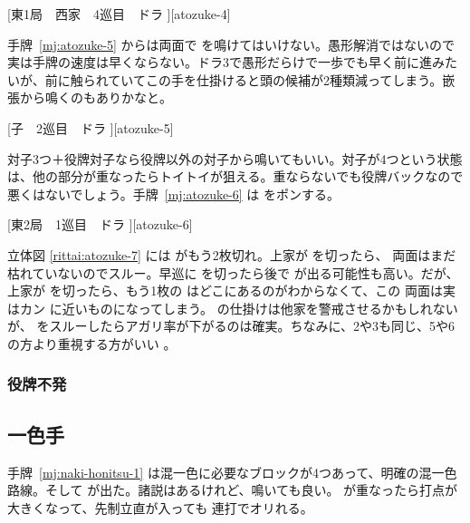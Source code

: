 \documentclass[../nankiru_main.tex]{subfiles}
\begin{document}
[東1局　西家　4巡目　ドラ ][atozuke-4]

手牌~\ref{mj:atozuke-5} からは両面で  を鳴けてはいけない。愚形解消ではないので実は手牌の速度は早くならない。ドラ3で愚形だらけで一歩でも早く前に進みたいが、前に触られていてこの手を仕掛けると頭の候補が2種類減ってしまう。嵌張から鳴くのもありかなと\citep[][pp.~116--117]{fkt}。

[子　2巡目　ドラ ][atozuke-5]

対子3つ＋役牌対子なら役牌以外の対子から鳴いてもいい。対子が4つという状態は、他の部分が重なったらトイトイが狙える。重ならないでも役牌バックなので悪くはないでしょう。手牌~\ref{mj:atozuke-6} は  をポンする\citep{yuusee-atozuke}。

[東2局　1巡目　ドラ ][atozuke-6]

立体図 \ref{rittai:atozuke-7} には  がもう2枚切れ。上家が  を切ったら、 両面はまだ枯れていないのでスルー。早巡に  を切ったら後で  が出る可能性も高い。だが、上家が  を切ったら、もう1枚の  はどこにあるのがわからなくて、この  両面は実はカン  に近いものになってしまう。 の仕掛けは他家を警戒させるかもしれないが、 をスルーしたらアガリ率が下がるのは確実。ちなみに、2や3も同じ、5や6の方より重視する方がいい \citep[][pp.~131--132]{kawamura-naki}。

\begin{rittai}[h]
  \centering
  \caption{}
  \label{rittai:atozuke-7}
\end{rittai}


\subsubsection*{役牌不発}


\subsection{一色手}

手牌~\ref{mj:naki-honitsu-1} は混一色に必要なブロックが4つあって、明確の混一色路線。そして  が出た。諸説はあるけれど、鳴いても良い\citep[][pp.~112--123, p~217]{fkt}。 が重なったら打点が大きくなって、先制立直が入っても  連打でオリれる。
\end{document}
